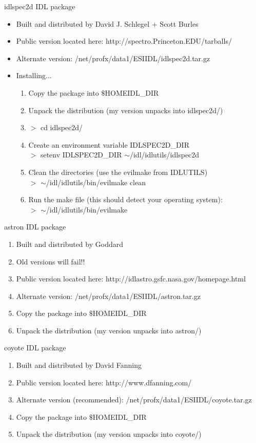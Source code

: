 \documentclass[11pt,letterpaper,dvips]{article}
\begin{document}
\begin{enumerate}
{\Large   \item idlspec2d IDL package}
   \begin{itemize}
	\item Built and distributed by David J. Schlegel + Scott Burles
	\item Public version located here: 
	http://spectro.Princeton.EDU/tarballs/
	\item Alternate version: 
	/net/profx/data1/ESIIDL/idlspec2d.tar.gz
	\item Installing...
	\begin{enumerate}
	  \item Copy the package into $\$$HOMEIDL\_DIR
	  \item Unpack the distribution (my version unpacks into idlspec2d/)
	  \item $>$ cd idlspec2d/
	  \item Create an environment variable IDLSPEC2D\_DIR\\
	  $>$ setenv IDLSPEC2D\_DIR $\sim$/idl/idlutils/idlspec2d
	  \item Clean the directories (use the evilmake from IDLUTILS) \\
	  $>$ $\sim$/idl/idlutils/bin/evilmake clean
	  \item Run the make file (this should detect your operating system):  \\
	  $>$ $\sim$/idl/idlutils/bin/evilmake  
	\end{enumerate}
   \end{itemize}

{\Large   \item astron IDL package}
   \begin{enumerate}
	\item Built and distributed by Goddard
	\item Old versions will fail!!
	\item Public version located here: 
	  http://idlastro.gsfc.nasa.gov/homepage.html
	\item Alternate version: 
	/net/profx/data1/ESIIDL/astron.tar.gz
	\item Copy the package into $\$$HOMEIDL\_DIR
	  \item Unpack the distribution (my version unpacks into astron/)
   \end{enumerate}

{\Large   \item coyote IDL package}
   \begin{enumerate}
	\item Built and distributed by David Fanning
	\item Public version located here: 
	  http://www.dfanning.com/
	\item Alternate version (recommended): 
	/net/profx/data1/ESIIDL/coyote.tar.gz
	\item Copy the package into $\$$HOMEIDL\_DIR
	  \item Unpack the distribution (my version unpacks into coyote/)
   \end{enumerate}


\end{enumerate}
\end{document}
